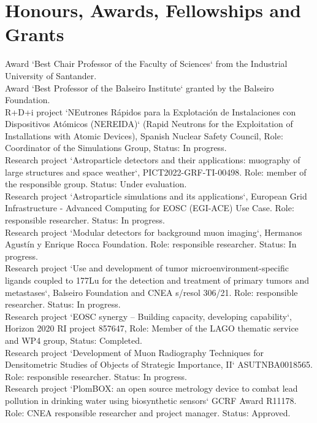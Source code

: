 \ifeng
\section*{Honours, Awards, Fellowships and Grants}
\noindent

 Award `Best Chair Professor of the Faculty of Sciences` from the Industrial University of Santander.\\
 Award `Best Professor of the Balseiro Institute` granted by the Balseiro Foundation.\\
 R+D+i project `NEutrones Rápidos para la Explotación de Instalaciones con Dispositivos Atómicos (NEREIDA)` (Rapid Neutrons for the Exploitation of Installations with Atomic Devices), Spanish Nuclear Safety Council, Role: Coordinator of the Simulations Group, Status: In progress.\\
 Research project `Astroparticle detectors and their applications: muography of large structures and space weather`, PICT2022-GRF-TI-00498. Role: member of the responsible group. Status: Under evaluation.\\
 Research project `Astroparticle simulations and its applications`, European Grid Infrastructure - Advanced Computing for EOSC (EGI-ACE) Use Case. Role: responsible researcher. Status: In progress.\\
 Research project `Modular detectors for background muon imaging`, Hermanos Agustín y Enrique Rocca Foundation. Role: responsible researcher. Status: In progress.\\
 Research project `Use and development of tumor microenvironment-specific ligands coupled to 177Lu for the detection and treatment of primary tumors and metastases`, Balseiro Foundation and CNEA s/resol 306/21. Role: responsible researcher. Status: In progress.\\
 Research project `EOSC synergy – Building capacity, developing capability`, Horizon 2020 RI project 857647, Role: Member of the LAGO thematic service and WP4 group, Status: Completed.\\
 Research project `Development of Muon Radiography Techniques for Densitometric Studies of Objects of Strategic Importance, II` ASUTNBA0018565. Role: responsible researcher. Status: In progress.\\
 Research project `PlomBOX: an open source metrology device to combat lead pollution in drinking water using biosynthetic sensors` GCRF Award R11178. Role: CNEA responsible researcher and project manager. Status: Approved.\\
